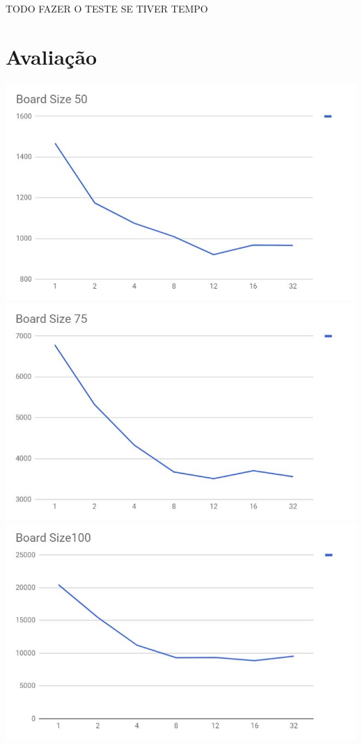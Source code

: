 \documentclass[a4paper]{article}
\begin{document}
TODO FAZER O TESTE SE TIVER TEMPO

\section{Avaliação}
\includegraphics{bs50.JPG}
\includegraphics{bs75.JPG}
\includegraphics{bs100.JPG}
\end{document}
